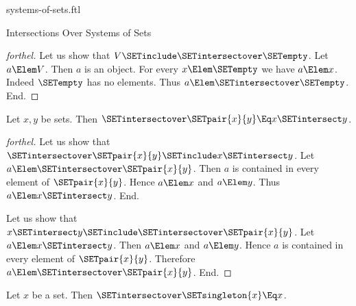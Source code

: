 \documentclass{stex}
\begin{document}
\begin{smodule}{systems-of-sets.ftl}
\begin{sfragment}{Intersections Over Systems of Sets}
\begin{proof}[forthel]
    Let us show that $V \SETinclude \SETintersectover \SETempty$.
      Let $a \Elem V$.
      Then $a$ is an object.
      For every $x \Elem \SETempty$ we have $a \Elem x$.
      Indeed $\SETempty$ has no elements.
      Thus $a \Elem \SETintersectover \SETempty$.
    End.
  \end{proof}

  \begin{proposition}[forthel]
    Let $x, y$ be sets.
    Then $\SETintersectover \SETpair{x}{y} \Eq x \SETintersect y$.
  \end{proposition}
  \begin{proof}[forthel]
    Let us show that $\SETintersectover \SETpair{x}{y} \SETinclude x \SETintersect y$.
      Let $a \Elem \SETintersectover \SETpair{x}{y}$.
      Then $a$ is contained in every element of $\SETpair{x}{y}$.
      Hence $a \Elem x$ and $a \Elem y$.
      Thus $a \Elem x \SETintersect y$.
    End.

    Let us show that $x \SETintersect y \SETinclude \SETintersectover \SETpair{x}{y}$.
      Let $a \Elem x \SETintersect y$.
      Then $a \Elem x$ and $a \Elem y$.
      Hence $a$ is contained in every element of $\SETpair{x}{y}$.
      Therefore $a \Elem \SETintersectover \SETpair{x}{y}$.
    End.
  \end{proof}

  \begin{corollary}[forthel]
    Let $x$ be a set.
    Then $\SETintersectover \SETsingleton{x} \Eq x$.
  \end{corollary}
\end{sfragment}
\end{smodule}
\end{document}
